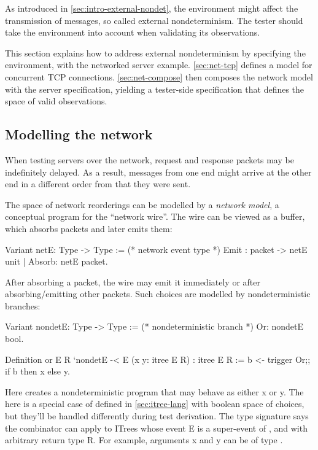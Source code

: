 As introduced in \autoref{sec:intro-external-nondet}, the environment might
affect the transmission of messages, so called external nondeterminism.  The
tester should take the environment into account when validating its
observations.

This section explains how to address external nondeterminism by specifying the
environment, with the networked server example.  \autoref{sec:net-tcp} defines a
model for concurrent TCP connections.  \autoref{sec:net-compose} then composes
the network model with the server specification, yielding a tester-side
specification that defines the space of valid observations.

\subsection{Modelling the network}
\label{sec:net-tcp}
When testing servers over the network, request and response packets may be
indefinitely delayed.  As a result, messages from one end might arrive at the
other end in a different order from that they were sent.

The space of network reorderings can be modelled by a {\em network model}, a
conceptual program for the ``network wire''.  The wire can be viewed as a
buffer, which absorbs packets and later emits them:
\begin{coq}
  Variant netE: Type -> Type := (* network event type *)
    Emit  : packet -> netE unit
  | Absorb: netE packet.
\end{coq}

After absorbing a packet, the wire may emit it immediately or after
absorbing/emitting other packets.  Such choices are modelled by nondeterministic
 branches:
\begin{coq}
  Variant nondetE: Type -> Type := (* nondeterministic branch *)
    Or: nondetE bool.

  Definition or {E R} `{nondetE -< E} (x y: itree E R) : itree E R :=
    b <- trigger Or;;
    if b then x else y.
\end{coq}

Here  creates a nondeterministic program that may behave as either
\ilc x or \ilc y.  The  here is a special case of 
defined in \autoref{sec:itree-lang} with boolean space of choices, but they'll
be handled differently during test derivation.  The type signature  says the  combinator can apply to ITrees whose
event \ilc E is a super-event of , and with arbitrary return type
\ilc R.  For example, arguments \ilc x and \ilc y can be of type .

